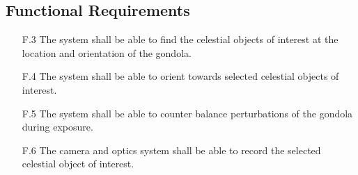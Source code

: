 \subsection{Functional Requirements}

\begin{enumerate}[topsep=0pt,itemsep=-0.5ex,partopsep=1ex,parsep=1ex]
    \item[F.3] The system shall be able to find the celestial objects of interest at the location and orientation of the gondola.
    \item[F.4] The system shall be able to orient towards selected celestial objects of interest.
    \item[F.5] The system shall be able to counter balance perturbations of the gondola during exposure.
    \item[F.6] The camera and optics system shall be able to record the selected celestial object of interest.
\end{enumerate}
